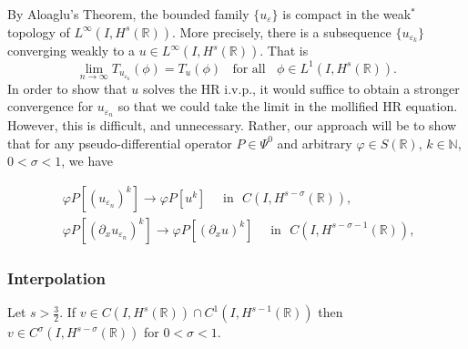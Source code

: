 \documentclass{beamer}
\newcommand{\rr}{\mathbb{R}}
\newcommand{\p}{\partial}
\newcommand{\ee}{\varepsilon}
\newcommand{\vp}{\varphi}
\begin{document}
\begin{frame}
By Aloaglu's Theorem, the bounded family $\{u_\ee\}$ is compact in the weak$^*$ topology of $L^\infty(I, H^s(\rr))$. More precisely,
there is a subsequence  $\{ u_{\ee_k} \}$ converging
weakly to a $ u\in L^{\infty}(I, H^s(\rr))$.
That is 
%
%
%
\begin{equation*}
\label{weak-conv}
\lim_{n\to \infty} T_{u_{\ee_k}}(\phi)  =  T_u (\phi) \; \;		\text{ for 
all } \;\;  \phi \in L^1(I, H^{s}(\rr)).
\end{equation*}
%
In order to show that $u$ solves the HR i.v.p., it would
suffice to obtain a stronger convergence for  $u_{\ee_n}$ so that 
we could take the limit in the mollified HR equation. However,
this is difficult, and unnecessary. Rather, our approach will be to
show that for any pseudo-differential operator
$P \in \Psi^0$ and arbitrary $\vp \in S(\rr)$, $k \in
\mathbb{N}$, $0< \sigma < 1$, we have
\end{frame}
%
\begin{frame}
%
%
\begin{align}
\label{hhstrong-conv}
& \varphi P [(u_{\ee_n})^k] \longrightarrow \varphi P [u^k]  
\quad
\text{ in } \,\,   C(I, H^{s-\sigma}(\rr)), \ \,
\\
\label{hhstrong-conv-next}
& \varphi P [(\p_x u_{\ee_n})^k] \longrightarrow \varphi P
[(\p_x u)^k]  
\quad
\text{ in } \,\,   C(I, H^{s-\sigma -1}(\rr)), \ \ 
\end{align}
%
\end{frame}
%
%
%
%
\begin{frame}
\frametitle{Interpolation}
\begin{lemma}
\label{interpolation-lem}
Let  $s > \frac{3}{2}$.
If $v \in C(I, H^s(\rr)) \cap C^1(I, H^{s-1}(\rr))$
then $v \in C^\sigma (I, H^{s- \sigma}(\rr))$ for  $0 < \sigma < 1$.
\end{lemma}
%
%
\end{frame}
%
\end{document}

